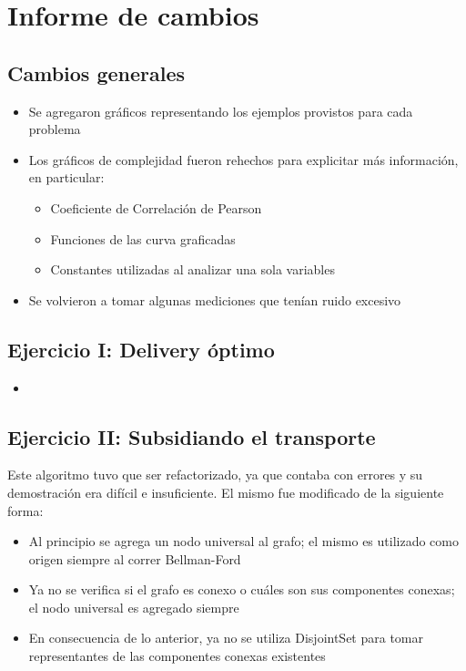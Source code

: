 \renewcommand\labelitemii{$\circ$}
\section{Informe de cambios}
	\subsection*{Cambios generales}

	\begin{itemize}
		\item Se agregaron gráficos representando los ejemplos provistos para cada problema

		\item Los gráficos de complejidad fueron rehechos para explicitar más información, en particular:

		\begin{itemize}
			\item Coeficiente de Correlación de Pearson

			\item Funciones de las curva graficadas

			\item Constantes utilizadas al analizar una sola variables
		\end{itemize}

		\item Se volvieron a tomar algunas mediciones que tenían ruido excesivo
	\end{itemize}

	\subsection*{Ejercicio I: Delivery óptimo}

	\begin{itemize}
		\item
	\end{itemize}

	\subsection*{Ejercicio II: Subsidiando el transporte}

		Este algoritmo tuvo que ser refactorizado, ya que contaba con errores y su demostración era difícil e insuficiente. El mismo fue modificado de la siguiente forma:
		
		\begin{itemize}
			\item Al principio se agrega un nodo universal al grafo; el mismo es utilizado como origen siempre al correr Bellman-Ford

			\item Ya no se verifica si el grafo es conexo o cuáles son sus componentes conexas; el nodo universal es agregado siempre

			\item En consecuencia de lo anterior, ya no se utiliza DisjointSet para tomar representantes de las componentes conexas existentes
		\end{itemize}

